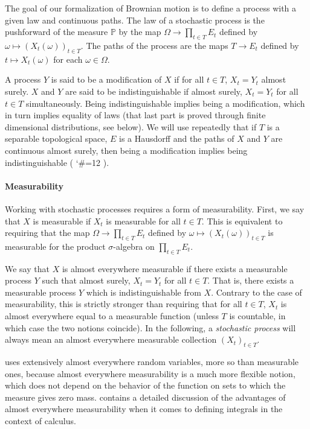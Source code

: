 \documentclass[lean]{Draft}
\makeatletter
\newcommand\leanlink{\begingroup\catcode`\#=12\relax\@leanlink}
\newcommand\@leanlink[2]{\endgroup
\href{#1}
{\texttt{\detokenize{#2}}}}
\newcommand{\docs}[1]{%
\leanlink{https://leanprover-community.github.io/mathlib4_docs/find/?pattern=#1\#doc}
{#1}}
\makeatother
\begin{document}
The goal of our formalization of Brownian motion is to define a process with a given law and continuous paths.
The law of a stochastic process is the pushforward of the measure $\mathbb{P}$ by the map $\Omega \to \prod_{t \in T} E_t$ defined by $\omega \mapsto (X_t(\omega))_{t \in T}$.
The paths of the process are the maps $T \to E_t$ defined by $t \mapsto X_t(\omega)$ for each $\omega \in \Omega$.

A process $Y$ is said to be a modification of $X$ if for all $t \in T$, $X_t = Y_t$ almost surely.
$X$ and $Y$ are said to be indistinguishable if almost surely, $X_t = Y_t$ for all $t \in T$ simultaneously.
Being indistinguishable implies being a modification, which in turn implies equality of laws (that last part is proved through finite dimensional distributions, see below).
We will use repeatedly that if $T$ is a separable topological space, $E$ is a Hausdorff and the paths of $X$ and $Y$ are continuous almost surely, then being a modification implies being indistinguishable (\docs{indistinguishable_of_modification}).


\paragraph{Measurability}

Working with stochastic processes requires a form of measurability.
First, we say that $X$ is measurable if $X_t$ is measurable for all $t \in T$.
This is equivalent to requiring that the map $\Omega \to \prod_{t \in T} E_t$ defined by $\omega \mapsto (X_t(\omega))_{t \in T}$ is measurable for the product $\sigma$-algebra on $\prod_{t \in T} E_t$.

We say that $X$ is almost everywhere measurable if there exists a measurable process $Y$ such that almost surely, $X_t = Y_t$ for all $t \in T$.
That is, there exists a measurable process $Y$ which is indistinguishable from $X$.
Contrary to the case of measurability, this is strictly stronger than requiring that for all $t \in T$, $X_t$ is almost everywhere equal to a measurable function (unless $T$ is countable, in which case the two notions coincide).
In the following, a \emph{stochastic process} will always mean an almost everywhere measurable collection $(X_t)_{t \in T}$.

\mathlib uses extensively almost everywhere random variables, more so than measurable ones, because almost everywhere measurability is a much more flexible notion, which does not depend on the behavior of the function on sets to which the measure gives zero mass.
\cite{gouezel2022formalization} contains a detailed discussion of the advantages of almost everywhere measurability when it comes to defining integrals in the context of calculus.
\end{document}
